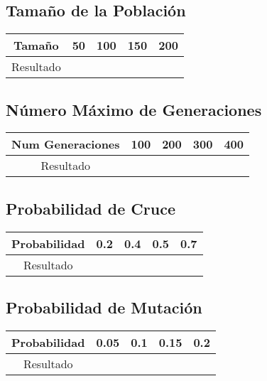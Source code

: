 \documentclass[12pt]{article}
\begin{document}
\subsection{Tamaño de la Población}

\begin{table}[H]
\begin{center}
\begin{tabular}{|ccccc|} \hline
Tamaño	   & 50 & 100 & 150 & 200 \\  \hline
Resultado  &   &  &  &  \\ \hline
\end{tabular}
\end{center}
\end{table}

	

\subsection{Número Máximo de Generaciones}
\begin{table}[H]
\begin{center}
\begin{tabular}{|ccccc|} \hline
Num Generaciones  & 100 & 200 & 300 & 400 \\  \hline
Resultado  &   &  &  &  \\ \hline
\end{tabular}
\end{center}
\end{table}	

	

\subsection{Probabilidad de Cruce}
\begin{table}[H]
\begin{center}
\begin{tabular}{|ccccc|} \hline
Probabilidad   & 0.2 & 0.4 & 0.5 & 0.7 \\  \hline
Resultado  &  &  &  &  \\ \hline
\end{tabular}
\end{center}
\end{table}

	

\subsection{Probabilidad de Mutación}
\begin{table}[H]
\begin{center}
\begin{tabular}{|ccccc|} \hline
Probabilidad   & 0.05 & 0.1 & 0.15 & 0.2 \\  \hline
Resultado  &   &  &  &  \\ \hline
\end{tabular}
\end{center}
\end{table}
\end{document}
